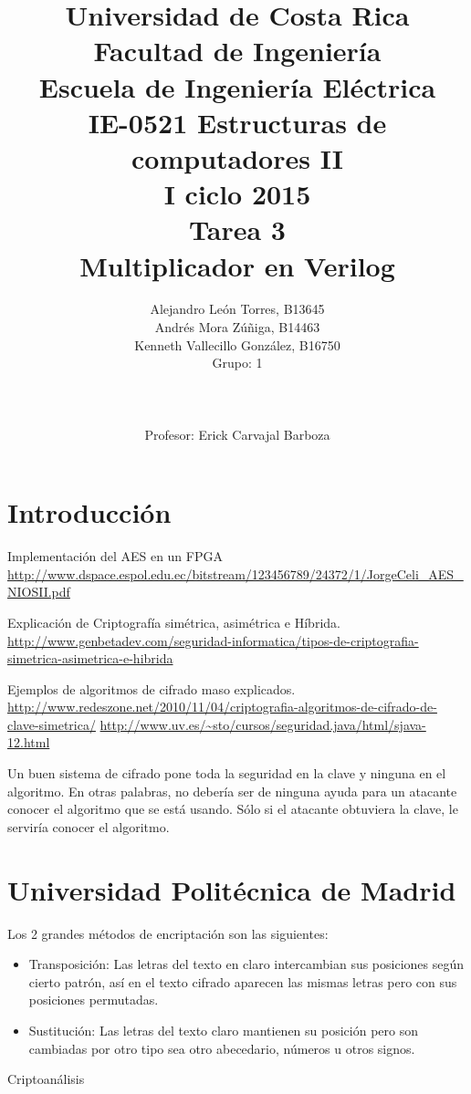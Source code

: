 \documentclass[12pt,letterpaper]{article}     %
\author{Alejandro León Torres, B13645 \\ Andrés Mora Zúñiga, B14463 \\ Kenneth Vallecillo González, B16750  \\ {\small Grupo: 1}\\ \\ \\ \\Profesor: Erick Carvajal Barboza  \vspace*{2.0in}}
\title{Universidad de Costa Rica\\{\small Facultad de Ingeniería\\Escuela de Ingeniería Eléctrica\\ IE-0521 Estructuras de computadores II \\ I ciclo 2015\\\vspace*{0.55in} Tarea 3}\\  \textbf{Multiplicador en Verilog}  \vspace*{1.55in}}
\begin{document}
\newpage

\maketitle	

\thispagestyle{empty}
\tableofcontents
\listoffigures
\listoftables
\newpage
\section{Introducción}
Implementación del AES en un FPGA
\url{http://www.dspace.espol.edu.ec/bitstream/123456789/24372/1/JorgeCeli_AES_NIOSII.pdf}

Explicación de Criptografía simétrica, asimétrica e Híbrida.
\url{http://www.genbetadev.com/seguridad-informatica/tipos-de-criptografia-simetrica-asimetrica-e-hibrida}

Ejemplos de algoritmos de cifrado maso explicados.
\url{http://www.redeszone.net/2010/11/04/criptografia-algoritmos-de-cifrado-de-clave-simetrica/}
\url{http://www.uv.es/~sto/cursos/seguridad.java/html/sjava-12.html}

Un buen sistema de cifrado pone toda la seguridad en la clave y ninguna en el algoritmo. En otras palabras, no debería ser de ninguna ayuda para un atacante conocer el algoritmo que se está usando. Sólo si el atacante obtuviera la clave, le serviría conocer el algoritmo.


\section{Universidad Politécnica de Madrid}
Los 2 grandes métodos de encriptación son las siguientes:
\begin{itemize}
\item Transposición: Las letras del texto en claro intercambian sus posiciones según cierto patrón, así en el texto cifrado aparecen las mismas letras pero con sus posiciones permutadas.

\item Sustitución: Las letras del texto claro mantienen su posición pero son cambiadas por otro tipo sea otro abecedario, números u otros signos.
\end{itemize} 

Criptoanálisis
\end{document}
